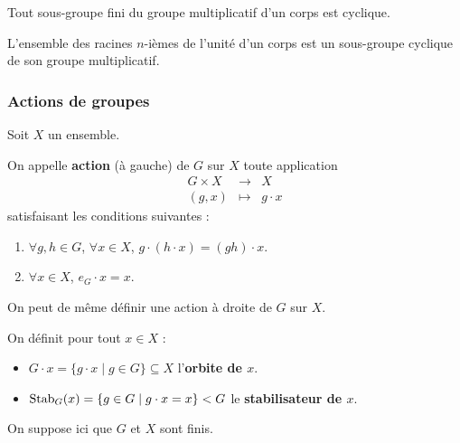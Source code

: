 
	\begin{theorem}
		Tout sous-groupe fini du groupe multiplicatif d'un corps est cyclique.
	\end{theorem}

	\begin{corollary}
		L'ensemble des racines $n$-ièmes de l'unité d'un corps est un sous-groupe cyclique de son groupe multiplicatif.
	\end{corollary}

	\subsubsection{Actions de groupes}


	Soit $X$ un ensemble.

	\begin{definition}
		On appelle \textbf{action} (à gauche) de $G$ sur $X$ toute application
		\[
		\begin{array}{ccc}
			G \times X &\rightarrow& X \\
			(g, x) &\mapsto& g \cdot x
		\end{array}
		\]
		satisfaisant les conditions suivantes :
		\begin{enumerate}[label=(\roman*)]
			\item $\forall g, h \in G$, $\forall x \in X$, $g \cdot (h \cdot x) = (gh) \cdot x$.
			\item $\forall x \in X$, $e_G \cdot x = x$.
		\end{enumerate}
	\end{definition}

	\begin{remark}
		On peut de même définir une action à droite de $G$ sur $X$.
	\end{remark}

	\begin{definition}
		On définit pour tout $x \in X$ :
		\begin{itemize}
			\item $G \cdot x = \{ g \cdot x \mid g \in G \} \subseteq X$ l'\textbf{orbite de $x$}.
			\item $\operatorname{Stab}_G(x) = \{ g \in G \mid g \cdot x = x \} < G$ le \textbf{stabilisateur de $x$}.
		\end{itemize}
	\end{definition}

	On suppose ici que $G$ et $X$ sont finis.

